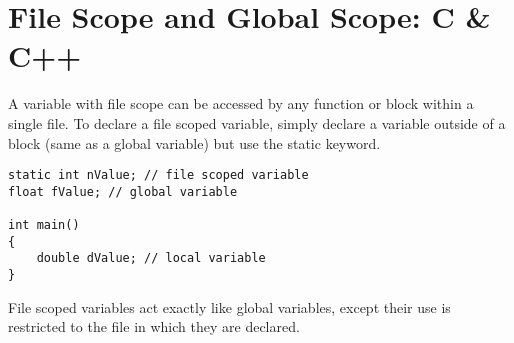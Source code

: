 \documentclass[11pt]{article}
\begin{document}
\section{File Scope and Global Scope: C \& C++}
\label{sec:orgc558376}


A variable with file scope can be accessed by any function or block
within a single file. To declare a file scoped variable, simply
declare a variable outside of a block (same as a global variable) but
use the static keyword.


\begin{verbatim}
static int nValue; // file scoped variable
float fValue; // global variable

int main()
{
    double dValue; // local variable
}
\end{verbatim}

File scoped variables act exactly like global variables, except their
use is restricted to the file in which they are declared.
\end{document}
